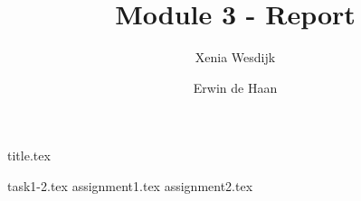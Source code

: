 \documentclass[final]{scrreprt} %
\title{Module 3 - Report}
\author{Xenia {Wesdijk} \and Erwin {de Haan}}
\begin{document}

{title.tex}

\newpage

\tableofcontents

\newpage
{}
{task1-2.tex}
{assignment1.tex}
{assignment2.tex}
\newpage
{}

\printbibliography
\end{document}

